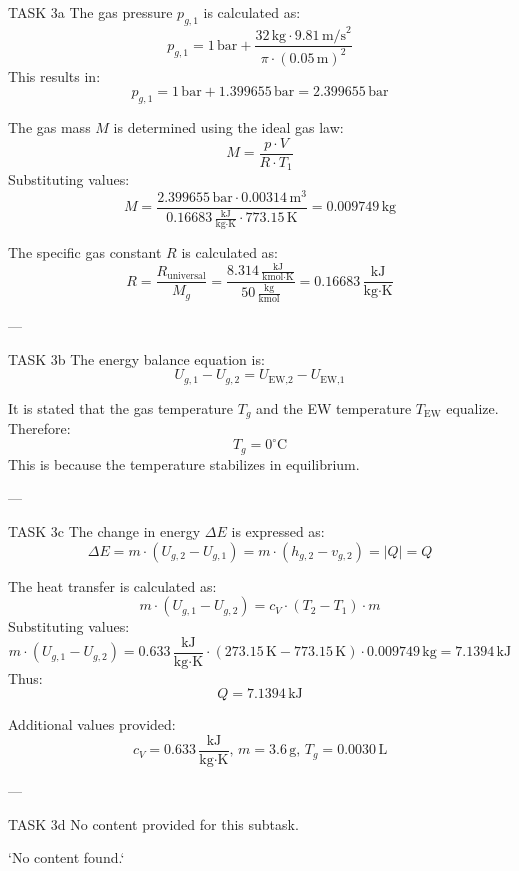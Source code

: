 TASK 3a  
The gas pressure \( p_{g,1} \) is calculated as:  
\[
p_{g,1} = 1 \, \text{bar} + \frac{32 \, \text{kg} \cdot 9.81 \, \text{m/s}^2}{\pi \cdot (0.05 \, \text{m})^2}
\]  
This results in:  
\[
p_{g,1} = 1 \, \text{bar} + 1.399655 \, \text{bar} = 2.399655 \, \text{bar}
\]  

The gas mass \( M \) is determined using the ideal gas law:  
\[
M = \frac{p \cdot V}{R \cdot T_1}
\]  
Substituting values:  
\[
M = \frac{2.399655 \, \text{bar} \cdot 0.00314 \, \text{m}^3}{0.16683 \, \frac{\text{kJ}}{\text{kg·K}} \cdot 773.15 \, \text{K}} = 0.009749 \, \text{kg}
\]  

The specific gas constant \( R \) is calculated as:  
\[
R = \frac{R_{\text{universal}}}{M_g} = \frac{8.314 \, \frac{\text{kJ}}{\text{kmol·K}}}{50 \, \frac{\text{kg}}{\text{kmol}}} = 0.16683 \, \frac{\text{kJ}}{\text{kg·K}}
\]  

---

TASK 3b  
The energy balance equation is:  
\[
U_{g,1} - U_{g,2} = U_{\text{EW,2}} - U_{\text{EW,1}}
\]  

It is stated that the gas temperature \( T_g \) and the EW temperature \( T_{\text{EW}} \) equalize. Therefore:  
\[
T_g = 0^\circ\text{C}
\]  
This is because the temperature stabilizes in equilibrium.

---

TASK 3c  
The change in energy \( \Delta E \) is expressed as:  
\[
\Delta E = m \cdot (U_{g,2} - U_{g,1}) = m \cdot (h_{g,2} - v_{g,2}) = |Q| = Q
\]  

The heat transfer is calculated as:  
\[
m \cdot (U_{g,1} - U_{g,2}) = c_V \cdot (T_2 - T_1) \cdot m
\]  
Substituting values:  
\[
m \cdot (U_{g,1} - U_{g,2}) = 0.633 \, \frac{\text{kJ}}{\text{kg·K}} \cdot (273.15 \, \text{K} - 773.15 \, \text{K}) \cdot 0.009749 \, \text{kg} = 7.1394 \, \text{kJ}
\]  
Thus:  
\[
Q = 7.1394 \, \text{kJ}
\]  

Additional values provided:  
\[
c_V = 0.633 \, \frac{\text{kJ}}{\text{kg·K}}, \, m = 3.6 \, \text{g}, \, T_g = 0.0030 \, \text{L}
\]  

---

TASK 3d  
No content provided for this subtask.  

`No content found.`